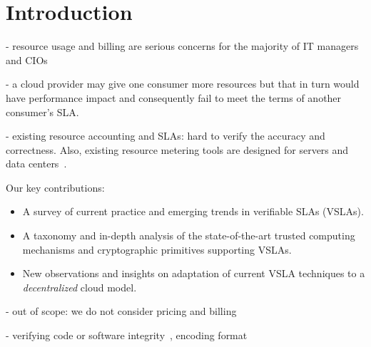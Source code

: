 \section{Introduction} \label{sect:intro}

- resource usage and billing are serious concerns for the majority of IT managers and CIOs 

- a cloud provider may give one consumer more resources but that in turn would have performance impact and consequently fail to meet the terms of another consumer's SLA.

- existing resource accounting and SLAs: hard to verify the accuracy and correctness. Also, existing resource metering tools are designed for servers and data centers~\cite{Bas12,MMS13}.



Our key contributions:
\begin{itemize}
 \item A survey of current practice and emerging trends in verifiable SLAs (VSLAs).
 \item A taxonomy and in-depth analysis of the state-of-the-art trusted computing mechanisms and cryptographic primitives supporting VSLAs.
 \item New observations and insights on adaptation of current VSLA techniques to a {\em decentralized} cloud model.
\end{itemize} 



- out of scope: we do not consider pricing and billing

- verifying code or software integrity~\cite{SLS05,SMV+10}, encoding format~\cite{DJO+12}